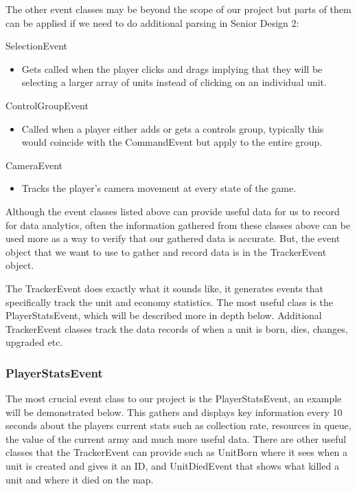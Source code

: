 \documentclass[a4paper,12pt]{report}
\begin{document}
The other event classes may be beyond the scope of our project but parts of them can be applied if we need to do additional parsing in Senior Design 2:

SelectionEvent
\begin{itemize}[,]
    \setlength\itemsep{-.1cm}
    \item Gets called when the player clicks and drags implying that they will be selecting a larger array of units instead of clicking on an individual unit. 
\end{itemize}
\vspace*{-.4cm}
ControlGroupEvent
\begin{itemize}[,]
    \setlength\itemsep{-.1cm}
    \item Called when a player either adds or gets a controls group, typically this would coincide with the CommandEvent but apply to the entire group.
\end{itemize}
\vspace*{-.4cm}
CameraEvent
\begin{itemize}[,]
    \setlength\itemsep{-.1cm}
    \item Tracks the player's camera movement at every state of the game.
\end{itemize}

Although the event classes listed above can provide useful data for us to record for data analytics, often the information gathered from these classes above can be used more as a way to verify that our gathered data is accurate. But, the event object that we want to use to gather and record data is in the TrackerEvent object.

The TrackerEvent does exactly what it sounds like, it generates events that specifically track the unit and economy statistics. The most useful class is the PlayerStatsEvent, which will be described more in depth below. Additional TrackerEvent classes track the data records of when a unit is born, dies, changes, upgraded etc.


\subsubsection{PlayerStatsEvent}

The most crucial event class to our project is the PlayerStatsEvent, an example will be demonstrated below. This gathers and displays key information every 10 seconds about the players current stats such as collection rate, resources in queue, the value of the current army and much more useful data. There are other useful classes that the TrackerEvent can provide such as UnitBorn where it sees when a unit is created and gives it an ID, and UnitDiedEvent that shows what killed a unit and where it died on the map.
\end{document}
